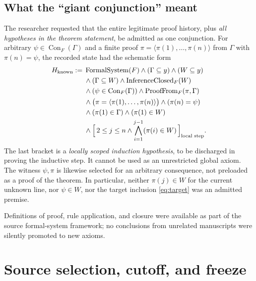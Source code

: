 \documentclass[11pt,letterpaper]{article}
\newcommand{\Con}{\operatorname{Con}}
\newcommand{\ProofFrom}{\operatorname{ProofFrom}}
\newcommand{\Closed}{\operatorname{InferenceClosed}}
\begin{document}
\subsection{What the ``giant conjunction'' meant}
The researcher requested that the entire legitimate proof history, plus \emph{all hypotheses in the theorem statement}, be admitted as one conjunction. For arbitrary $\psi\in\Con_F(\Gamma)$ and a finite proof $\pi=\langle\pi(1),\dots,\pi(n)\rangle$ from $\Gamma$ with $\pi(n)=\psi$, the recorded state had the schematic form
\begin{align}\label{eq:H}
H_{\rm known}:={}& \operatorname{FormalSystem}(F)
\land (\Gamma\subseteq y)\land(W\subseteq y) \notag\\
&\land (\Gamma\subseteq W)\land \Closed_F(W)\notag\\
&\land (\psi\in\Con_F(\Gamma))\land\ProofFrom_F(\pi,\Gamma)\notag\\
&\land \bigl(\pi=\langle\pi(1),\ldots,\pi(n)\rangle\bigr)
\land (\pi(n)=\psi)\notag\\
&\land (\pi(1)\in\Gamma)\land (\pi(1)\in W)\notag\\
&\land \Bigl[\,2\le j\le n\land\bigwedge_{i=1}^{j-1}(\pi(i)\in W)\,\Bigr]_{\text{local step}}.
\end{align}
The last bracket is a \emph{locally scoped induction hypothesis}, to be discharged in proving the inductive step. It cannot be used as an unrestricted global axiom. The witness $\psi,\pi$ is likewise selected for an arbitrary consequence, not preloaded as a proof of the theorem. In particular, neither $\pi(j)\in W$ for the current unknown line, nor $\psi\in W$, nor the target inclusion \eqref{eq:target} was an admitted premise.

Definitions of proof, rule application, and closure were available as part of the source formal-system framework; no conclusions from unrelated manuscripts were silently promoted to new axioms.

\section{Source selection, cutoff, and freeze}
\end{document}
